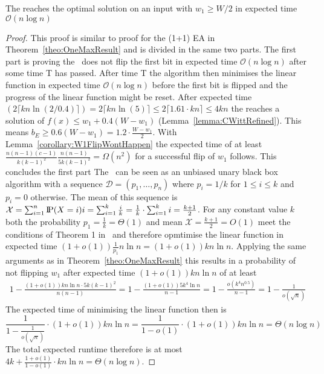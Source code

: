 \begin{lemma}\label{lemma:RLSRoneMaxInput}
      The \RLSR[k] reaches the optimal solution on an input with $w_1\ge W/2$ in expected time $\mathcal{O}(n\log{}n)$
\end{lemma}
\begin{proof}
      This proof is similar to proof for the (1+1) EA in Theorem~\ref{theo:OneMaxResult} and is divided in the same two parts.
      The first part is proving the \RLSR~does not flip the first bit in expected time $\mathcal{O}(n\log{}n)$ after some time T has passed.
      After time T the algorithm then minimises the linear function in expected time $\mathcal{O}(n\log{}n)$ before the first bit is flipped and the progress of the linear function might be reset.
      After expected time $(2\lceil kn\ln(2/0.4)\rceil)=2\lceil kn\ln(5)\rceil\le2\lceil 1.61\cdot kn\rceil\le4kn$ the \RLSR[k] reaches a solution of \(f(x)\le w_1+0.4(W-w_1)\) (Lemma~\ref{lemma:CWittRefined}).
      This means \(b_E \ge 0.6(W-w_1) = 1.2\cdot\frac{W-w_1}{2}\).
      With Lemma~\ref{corollary:W1FlipWontHappen} the expected time of at least \(\frac{n(n-1)(c-1)}{k{(k-1)}^2}\frac{n(n-1)}{5k{(k-1)}^2}=\Omega(n^2)\) for a successful flip of $w_1$ follows. This concludes the first part\newline
      The \RLSR~can be seen as an unbiased unary black box algorithm with a sequence $\mathcal{D}=(p_1,\dots,p_n)$ where $p_i=1/k$ for $1\le i\le k$ and $p_i=0$ otherwise.
      The mean of this sequence is \(\mathcal{X}=\sum_{i=1}^{n}{\text{I\kern-0.15em P}(X=i)i}=\sum_{i=1}^{k}{\frac{i}{k}}=\frac{1}{k}\cdot\sum_{i=1}^{k}{i}=\frac{k+1}{2}\).
      For any constant value $k$ both the probability $p_1=\frac{1}{k}=\Theta(1)$ and mean $\mathcal{X}=\frac{k+1}{2}=O(1)$ meet the conditions of Theorem 1 in~\cite{doerr2023tight} and therefore opmtimise the linear function in expected time \((1+o(1))\frac{1}{p_1}n\ln n=(1+o(1))kn\ln n\).
      Applying the same arguments as in Theorem~\ref{theo:OneMaxResult} this results in a probability of not flipping $w_1$ after expected time $(1+o(1))kn\ln n$ of at least
      \begin{gather}\nonumber
            1-\frac{(1+o(1))kn\ln n\cdot5k{(k-1)}^2}{n(n-1)}
            =1-\frac{(1+o(1))5k^4\ln n}{n-1}
            =1-\frac{o(k^4n^{0.5})}{n-1}
            =1-\frac{1}{o(\sqrt{n})}
      \end{gather}
      The expected time of minimising the linear function then is
      \[\frac{1}{1-\frac{1}{o(\sqrt{n})}}\cdot(1+o(1))kn\ln n=\frac{1}{1-o(1)}\cdot(1+o(1))kn\ln n=\Theta(n\log{}n)\]
      The total expected runtime therefore is at most $4k+\frac{1+o(1)}{1-o(1)}\cdot kn\ln n=\Theta(n\log{}n)$.


\end{proof}
